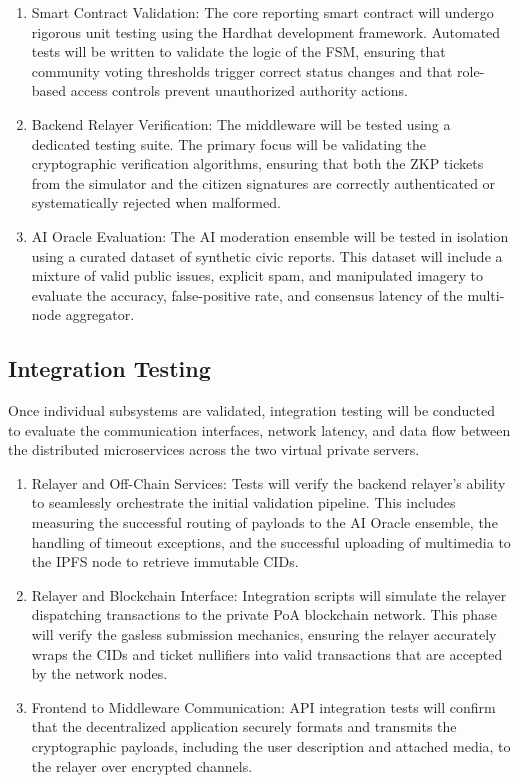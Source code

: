 \begin{enumerate}
    \item Smart Contract Validation: The core reporting smart contract will undergo rigorous unit testing using the Hardhat development framework. Automated tests will be written to validate the logic of the \ac{FSM}, ensuring that community voting thresholds trigger correct status changes and that role-based access controls prevent unauthorized authority actions.
    \item Backend Relayer Verification: The middleware will be tested using a dedicated testing suite. The primary focus will be validating the cryptographic verification algorithms, ensuring that both the \ac{ZKP} tickets from the simulator and the citizen signatures are correctly authenticated or systematically rejected when malformed.
    \item AI Oracle Evaluation: The AI moderation ensemble will be tested in isolation using a curated dataset of synthetic civic reports. This dataset will include a mixture of valid public issues, explicit spam, and manipulated imagery to evaluate the accuracy, false-positive rate, and consensus latency of the multi-node aggregator.
\end{enumerate}

\subsection{Integration Testing}
Once individual subsystems are validated, integration testing will be conducted to evaluate the communication interfaces, network latency, and data flow between the distributed microservices across the two virtual private servers.

\begin{enumerate}
    \item Relayer and Off-Chain Services: Tests will verify the backend relayer's ability to seamlessly orchestrate the initial validation pipeline. This includes measuring the successful routing of payloads to the AI Oracle ensemble, the handling of timeout exceptions, and the successful uploading of multimedia to the IPFS node to retrieve immutable \ac{CID}s.
    \item Relayer and Blockchain Interface: Integration scripts will simulate the relayer dispatching transactions to the private \ac{PoA} blockchain network. This phase will verify the gasless submission mechanics, ensuring the relayer accurately wraps the \ac{CID}s and ticket nullifiers into valid transactions that are accepted by the network nodes.
    \item Frontend to Middleware Communication: API integration tests will confirm that the decentralized application securely formats and transmits the cryptographic payloads, including the user description and attached media, to the relayer over encrypted channels.
\end{enumerate}

